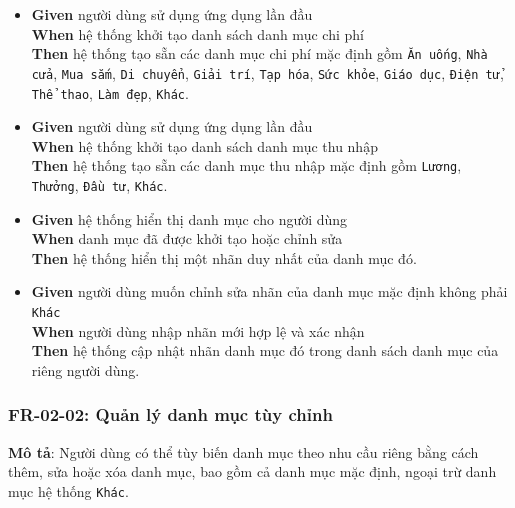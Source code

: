\begin{itemize}
\item \textbf{Given} người dùng sử dụng ứng dụng lần đầu  \\ \hspace*{1.5em}  \textbf{When} hệ thống khởi tạo danh sách danh mục chi phí  \\ \hspace*{1.5em}  \textbf{Then} hệ thống tạo sẵn các danh mục chi phí mặc định gồm \texttt{Ăn uống}, \texttt{Nhà cửa}, \texttt{Mua sắm}, \texttt{Di chuyển}, \texttt{Giải trí}, \texttt{Tạp hóa}, \texttt{Sức khỏe}, \texttt{Giáo dục}, \texttt{Điện tử}, \texttt{Thể thao}, \texttt{Làm đẹp}, \texttt{Khác}.
\item \textbf{Given} người dùng sử dụng ứng dụng lần đầu  \\ \hspace*{1.5em}  \textbf{When} hệ thống khởi tạo danh sách danh mục thu nhập  \\ \hspace*{1.5em}  \textbf{Then} hệ thống tạo sẵn các danh mục thu nhập mặc định gồm \texttt{Lương}, \texttt{Thưởng}, \texttt{Đầu tư}, \texttt{Khác}.
\item \textbf{Given} hệ thống hiển thị danh mục cho người dùng  \\ \hspace*{1.5em}  \textbf{When} danh mục đã được khởi tạo hoặc chỉnh sửa  \\ \hspace*{1.5em}  \textbf{Then} hệ thống hiển thị một nhãn duy nhất của danh mục đó.
\item \textbf{Given} người dùng muốn chỉnh sửa nhãn của danh mục mặc định không phải \texttt{Khác}  \\ \hspace*{1.5em}  \textbf{When} người dùng nhập nhãn mới hợp lệ và xác nhận  \\ \hspace*{1.5em}  \textbf{Then} hệ thống cập nhật nhãn danh mục đó trong danh sách danh mục của riêng người dùng.
\end{itemize}
\subsubsection{FR-02-02: Quản lý danh mục tùy chỉnh}

\textbf{Mô tả}: Người dùng có thể tùy biến danh mục theo nhu cầu riêng bằng cách thêm, sửa hoặc xóa danh mục, bao gồm cả danh mục mặc định, ngoại trừ danh mục hệ thống \texttt{Khác}.



